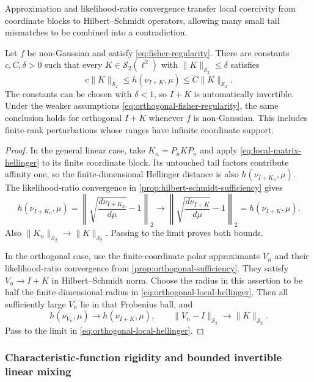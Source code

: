 Approximation and likelihood-ratio convergence transfer local coercivity from
coordinate blocks to Hilbert--Schmidt operators, allowing many small tail
mismatches to be combined into a contradiction.

\begin{lemma}
\label{lem:local-hs-coercivity}
Let $f$ be non-Gaussian and satisfy
\eqref{eq:fisher-regularity}.  There are constants
$c,C,\delta>0$ such that every $K\in\mathcal S_2(\ell^2)$ with
$\|K\|_{\mathcal S_2}\le\delta$ satisfies
\begin{equation}
 c\|K\|_{\mathcal S_2}
 \le h(\nu_{I+K},\mu)
 \le C\|K\|_{\mathcal S_2}.
 \label{eq:local-hs-hellinger}
\end{equation}
The constants can be chosen with $\delta<1$, so $I+K$ is
automatically invertible.  Under the weaker assumptions
\eqref{eq:orthogonal-fisher-regularity}, the same conclusion
holds for orthogonal $I+K$ whenever $f$ is non-Gaussian.
This includes finite-rank perturbations whose ranges have
infinite coordinate support.
\end{lemma}

\begin{proof}
In the general linear case, take $K_n=P_nKP_n$ and apply
\eqref{eq:local-matrix-hellinger} to its finite coordinate
block.  Its untouched tail factors contribute affinity one,
so the finite-dimensional Hellinger distance is also
$h(\nu_{I+K_n},\mu)$.  The likelihood-ratio convergence in
\cref{prop:hilbert-schmidt-sufficiency} gives
\[
 h(\nu_{I+K_n},\mu)
 =\left\|\sqrt{\frac{d\nu_{I+K_n}}{d\mu}}-1\right\|_2
 \longrightarrow
 \left\|\sqrt{\frac{d\nu_{I+K}}{d\mu}}-1\right\|_2
 =h(\nu_{I+K},\mu).
\]
Also $\|K_n\|_{\mathcal S_2}\to\|K\|_{\mathcal S_2}$.
Passing to the limit proves both bounds.

In the orthogonal case, use the finite-coordinate polar
approximants $V_n$ and their likelihood-ratio convergence from
\cref{prop:orthogonal-sufficiency}.  They satisfy
$V_n\to I+K$ in Hilbert--Schmidt norm.  Choose the radius in
this assertion to be half the finite-dimensional radius in
\eqref{eq:orthogonal-local-hellinger}.  Then all sufficiently
large $V_n$ lie in that Frobenius ball, and
\[
 h(\nu_{V_n},\mu)\longrightarrow h(\nu_{I+K},\mu),
 \qquad
 \|V_n-I\|_{\mathcal S_2}\longrightarrow\|K\|_{\mathcal S_2}.
\]
Pass to the limit in \eqref{eq:orthogonal-local-hellinger}.
\end{proof}

\subsubsection{Characteristic-function rigidity and bounded invertible linear mixing}
\label{sec:characteristic-function-rigidity}

